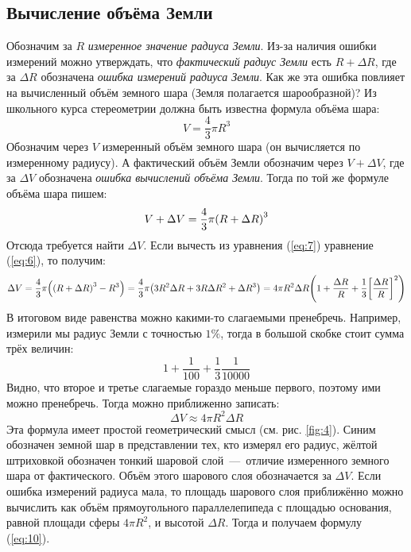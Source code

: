 \documentclass[titlepage]{article}
\begin{document}
\subsection{Вычисление объёма Земли}
Обозначим за $R$ \emph{измеренное значение радиуса Земли}. Из\--за наличия ошибки измерений можно утверждать, что \emph{фактический радиус Земли} есть $R+\Delta R$, где за $\Delta R$ обозначена \emph{ошибка измерений радиуса Земли}. Как же эта ошибка повлияет на вычисленный объём земного шара (Земля полагается шарообразной)? Из школьного курса стереометрии должна быть известна формула объёма шара:
\begin{equation}\label{eq:6}
 V = \dfrac43 \pi R^3
\end{equation}
Обозначим через $V$ измеренный объём земного шара (он вычисляется по измеренному радиусу). А фактический объём Земли обозначим через $V + \Delta V$, где  за $\Delta V$ обозначена \emph{ошибка вычислений объёма Земли}. Тогда по той же формуле объёма шара пишем:
\begin{equation}\label{eq:7}
 V + \Delta V = \dfrac43 \pi \qty(R + \Delta R)^3
\end{equation}
Отсюда требуется найти $\Delta V$. Если вычесть из уравнения (\ref{eq:7}) уравнение (\ref{eq:6}), то получим:
\begin{equation}
 \Delta V = \dfrac43 \pi \qty(\qty(R + \Delta R)^3 - R^3)=\dfrac43 \pi \qty(3R^2\Delta R + 3R \Delta R^2 + \Delta R^3) = 4 \pi R^2\Delta R \qty( 1 + \dfrac{\Delta R}{R} +\dfrac{1}{3} \qty[\dfrac{\Delta  R}{R}]^2 )
\end{equation}
В итоговом виде равенства можно какими-то слагаемыми пренебречь. Например, измерили мы радиус Земли с точностью $1\%$, тогда в большой скобке стоит сумма трёх величин:
\begin{equation}
 1 + \dfrac{1}{100} + \dfrac{1}{3}\dfrac{1}{10000}
\end{equation}
Видно, что второе и третье слагаемые гораздо меньше первого, поэтому ими можно пренебречь. Тогда можно приближенно записать:
\begin{equation}\label{eq:10}
 \Delta V \approx 4 \pi R^2\Delta R
\end{equation}
Эта формула имеет простой геометрический смысл (см. рис. \ref{fig:4}). Синим обозначен земной шар в представлении тех, кто измерял его радиус, жёлтой штриховкой обозначен тонкий шаровой слой~\----~отличие измеренного земного шара от фактического. Объём этого шарового слоя обозначается за $\Delta V$. Если ошибка измерений радиуса мала, то площадь шарового слоя приближённо можно вычислить как объём прямоугольного параллелепипеда с площадью основания, равной площади сферы $4 \pi R^2$, и высотой $\Delta R$. Тогда и получаем формулу (\ref{eq:10}).
\end{document}
